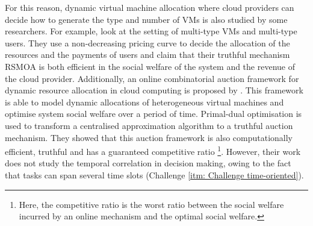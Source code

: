 \documentclass[11pt]{phdthesis}
\begin{document}
For this reason, dynamic virtual machine allocation where cloud providers can decide how to generate the type and number of VMs is also studied by some researchers. For example, \citet{shi2014rsmoa} look at the setting of multi-type VMs and multi-type users. They use a non-decreasing pricing curve to decide the allocation of the resources and the payments of users and claim that their truthful mechanism RSMOA is both efficient in the social welfare of the system and the revenue of the cloud provider. Additionally, an online combinatorial auction framework for dynamic resource allocation in cloud computing is proposed by \citet{shi2014online}. This framework is able to model dynamic allocations of heterogeneous virtual machines and optimise system social welfare over a period of time. Primal-dual optimisation is used to transform a centralised approximation algorithm to a truthful auction mechanism. They showed that this auction framework is also computationally efficient, truthful and has a guaranteed competitive ratio \footnote{Here, the competitive ratio is the worst ratio between the social welfare incurred by an online mechanism and the optimal social welfare.}. However, their work does not study the temporal correlation in decision making, owing to the fact that tasks can span several time slots (Challenge \ref{itm: Challenge time-oriented}). 
\end{document}
